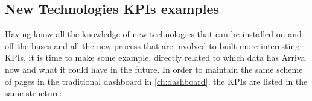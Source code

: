 \thispagestyle{empty}
\subsection{New Technologies KPIs examples}
\label{subsec:newKPIex}
Having know all the knowledge of new technologies that can be installed on and off the buses and all the new process that are involved to built more interesting KPIs, it is time to make some example, directly related to which data has Arriva now and what it could have in the future. In order to maintain the same scheme of pages in the traditional dashboard in \ref{ch:dashboard}, the KPIs are listed in the same structure:

